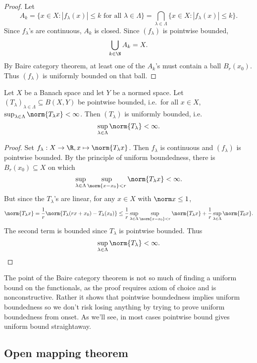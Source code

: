 \documentclass[a4paper]{article}
\begin{document}
\begin{proof}
  Let
  \[
    A_k = \{x \in X: |f_\lambda(x)| \leq k \text{ for all } \lambda \in \Lambda\}
    = \bigcap_{\lambda \in \Lambda} \{x \in X: |f_\lambda(x)| \leq k\}.
  \]
  Since \(f_\lambda\)'s are continuous, \(A_k\) is closed. Since \((f_\lambda)\) is pointwise bounded,
  \[
    \bigcup_{k \in \N} A_k = X.
  \]
  By Baire category theorem, at least one of the \(A_k\)'s must contain a ball \(B_r(x_0)\). Thus \((f_\lambda)\) is uniformly bounded on that ball.
\end{proof}

\begin{theorem}
  Let \(X\) be a Banach space and let \(Y\) be a normed space. Let \((T_\lambda)_{\lambda \in \Lambda} \subseteq B(X, Y)\) be pointwise bounded, i.e.\ for all \(x \in X\), \(\sup_{\lambda \in \Lambda} \norm{T_\lambda x} < \infty\). Then \((T_\lambda)\) is uniformly bounded, i.e.
  \[
    \sup_{\lambda \in \Lambda} \norm{T_\lambda} < \infty.
  \]
\end{theorem}

\begin{proof}
  Set \(f_\lambda: X \to \R, x \mapsto \norm{T_\lambda x}\). Then \(f_\lambda\) is continuous and \((f_\lambda)\) is pointwise bounded. By the principle of uniform boundedness, there is \(B_r(x_0) \subseteq X\) on which
  \[
    \sup_{\lambda \in \Lambda} \sup_{\norm{x - x_0} < r} \norm{T_\lambda x} < \infty.
  \]
  But since the \(T_\lambda\)'s are linear, for any \(x \in X\) with \(\norm x \leq 1\),
  \[
    \norm{T_\lambda x}
    = \frac{1}{r} \norm{T_\lambda(rx + x_0) - T_\lambda(x_0)}
    \leq \frac{1}{r} \sup_{\lambda \in \Lambda} \sup_{\norm{x - x_0} < r} \norm{T_\lambda x} + \frac{1}{r} \sup_{\lambda \in \Lambda} \norm{T_0x}.
  \]
  The second term is bounded since \(T_\lambda\) is pointwise bounded. Thus
  \[
    \sup_{\lambda \in \Lambda} \norm{T_\lambda} < \infty.
  \]
\end{proof}

The point of the Baire category theorem is not so much of finding a uniform bound on the functionals, as the proof requires axiom of choice and is nonconstructive. Rather it shows that pointwise boundedness implies uniform boundedness so we don't risk losing anything by trying to prove uniform boundedness from onset. As we'll see, in most cases pointwise bound gives uniform bound straightaway.

\subsection{Open mapping theorem}
\end{document}
